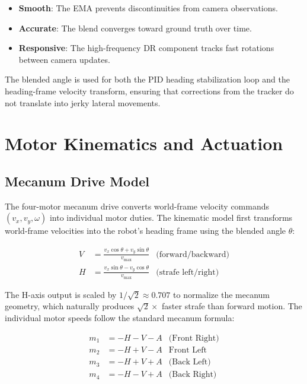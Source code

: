 \documentclass[12pt, a4paper, twoside]{article}
\begin{document}
\begin{itemize}
    \item \textbf{Smooth}: The EMA prevents discontinuities from camera observations.
    \item \textbf{Accurate}: The blend converges toward ground truth over time.
    \item \textbf{Responsive}: The high-frequency DR component tracks fast rotations between camera updates.
\end{itemize}

The blended angle is used for both the PID heading stabilization loop and the heading-frame velocity transform, ensuring that corrections from the tracker do not translate into jerky lateral movements.

\section{Motor Kinematics and Actuation}
\label{sec:motors}

\subsection{Mecanum Drive Model}

The four-motor mecanum drive converts world-frame velocity commands $(v_x, v_y, \omega)$ into individual motor duties. The kinematic model first transforms world-frame velocities into the robot's heading frame using the blended angle $\theta$:

\begin{align}
    V &= \frac{v_x \cos\theta + v_y \sin\theta}{v_{\max}} & \text{(forward/backward)} \\
    H &= \frac{v_x \sin\theta - v_y \cos\theta}{v_{\max}} & \text{(strafe left/right)}
\end{align}

The H-axis output is scaled by $1/\sqrt{2} \approx 0.707$ to normalize the mecanum geometry, which naturally produces $\sqrt{2}\times$ faster strafe than forward motion. The individual motor speeds follow the standard mecanum formula:

\begin{align}
    m_1 &= -H - V - A & \text{(Front Right)} \\
    m_2 &= -H + V - A & \text{Front Left} \\
    m_3 &= -H + V + A & \text{(Back Left)} \\
    m_4 &= -H - V + A & \text{(Back Right)}
\end{align}
\end{document}

